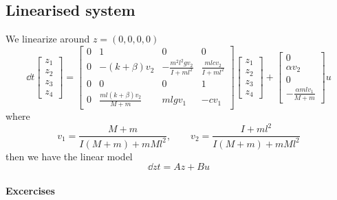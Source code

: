 \documentclass[12pt]{article}
\begin{document}
\subsection{Linearised system} 
We linearize around $z=(0,0,0,0)$
\[
\dd{}{t} \begin{bmatrix}
z_1 \\ z_2 \\ z_3 \\ z_4 \end{bmatrix} = \begin{bmatrix}
0 & 1 & 0 & 0 \\
0 & - (k+\beta) v_2 & - \frac{m^2 l^2 g v_2}{I + ml^2} & \frac{ml c v_2}{I + ml^2} \\
0 & 0 & 0 & 1 \\
0 & \frac{ml(k+\beta)v_2}{M+m} & mlgv_1 & - c  v_1
\end{bmatrix} \begin{bmatrix}
z_1 \\ z_2 \\ z_3 \\ z_4 \end{bmatrix} +
\begin{bmatrix}
0 \\ \alpha v_2 \\ 0 \\ -\frac{\alpha mlv_1}{M+m} \end{bmatrix} u
\]
where
\[
v_1 = \frac{M + m}{I(M+m) + mMl^2}, \qquad v_2 = \frac{I + ml^2}{I(M+m) + mMl^2}
\]
then we have the linear model
\[
\dd{z}{t} = Az + Bu
\]
\paragraph{Excercises}
\end{document}
